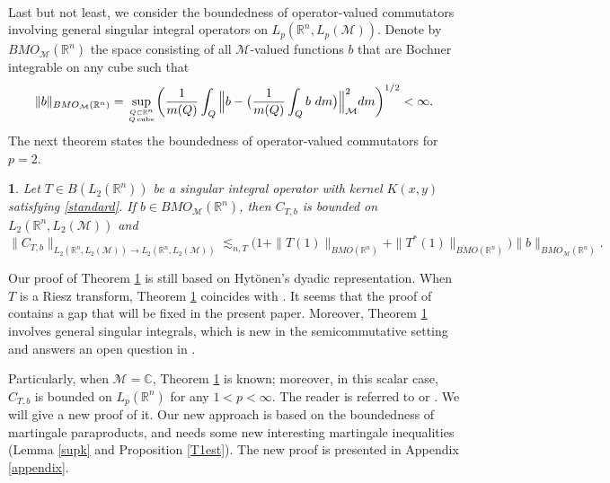 \documentclass[oneside,english,a4wide]{amsart}
\numberwithin{equation}{section}
\numberwithin{figure}{section}
\theoremstyle{plain}
\newtheorem{thm}{\protect\theoremname}[section]
\theoremstyle{plain}
\theoremstyle{definition}
\theoremstyle{plain}
\theoremstyle{remark}
\theoremstyle{definition}
\theoremstyle{remark}
\theoremstyle{definition}
\providecommand{\theoremname}{Theorem}
\newcommand{\M}{{\mathcal M}}
\newcommand{\8}{\infty}
\begin{document}
\

Last but not least, we consider the boundedness of operator-valued commutators involving general singular integral operators on $L_p(\mathbb{R}^n, L_p(\M))$. Denote by $BMO_\mathcal{M}(\mathbb{R}^n)$ the space consisting of all $\mathcal{M}$-valued functions $b$ that are Bochner integrable on any cube such that
\begin{equation*}
	\|b\|_{BMO_\mathcal{M}(\mathbb{R}^n)}=\sup_{Q\subset \mathbb{R}^n \atop Q \operatorname{cube}}\biggl(\frac{1}{m(Q)}\int_Q \Big\|b-\big(\frac{1}{m(Q)} \int_Q b\ d m\big)\Big\|_\mathcal{M}^2 dm\biggr)^{1/2}<\infty.
\end{equation*}
 The next theorem states the boundedness of operator-valued commutators for $p=2$.
\begin{thm}\label{thm1.8}
	Let $T\in B(L_2(\mathbb{R}^n))$ be a singular integral operator with kernel $K(x,y)$ satisfying \eqref{standard}. If $b\in BMO_\mathcal{M}(\mathbb{R}^n)$, then $ C_{T, b}$ is bounded on $L_2(\mathbb{R}^n,L_2(\mathcal{M}))$ and
	$$ \| C_{T, b}\|_{L_2(\mathbb{R}^n,L_2(\mathcal{M}))\rightarrow L_2(\mathbb{R}^n,L_2(\mathcal{M}))}\lesssim_{n,T }\big(1+\|T(1)\|_{BMO(\mathbb{R}^n)}+\|T^*(1)\|_{BMO(\mathbb{R}^n)}\big)\|b\|_{BMO_{\mathcal{M}}(\mathbb{R}^n)}. $$
\end{thm}
Our proof of Theorem \ref{thm1.8} is still based on Hyt\"{o}nen's dyadic representation. When $T$ is a Riesz transform, Theorem \ref{thm1.8} coincides with \cite[Theorem A.1]{HM}. It seems that the proof of \cite[Theorem A.1]{HM} contains a gap that will be fixed in the present paper. Moreover, Theorem \ref{thm1.8} involves general singular integrals, which is new in the semicommutative setting and answers an open question in \cite[Remark A.3]{HM}.

Particularly, when $\mathcal{M}=\mathbb{C}$, Theorem \ref{thm1.8} is known; moreover, in this scalar case, $C_{T,b}$ is bounded on $L_p(\mathbb{R}^n)$ for any $1<p<\infty$. The reader is referred to \cite[Theorem 1.1]{HLW} or \cite[Theorem 3.1]{CPP2012}. We will give a new proof of it. 
Our new approach is based on the boundedness of martingale paraproducts, and needs some new interesting martingale inequalities (Lemma \ref{supk} and Proposition \ref{T1est}). The new proof is presented in Appendix \ref{appendix}.
\end{document}

